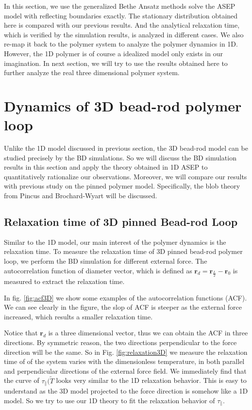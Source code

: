 In this section, we use the generalized Bethe Ansatz methods solve the ASEP model with reflecting boundaries exactly.  The stationary distribution obtained here is compared with our previous results. And the analytical relaxation time, which is verified by the simulation results, is analyzed in different cases. We also re-map it back to the polymer system to analyze the polymer dynamics in 1D. However, the 1D polymer is of course a idealized model only exists in our imagination. In next section, we will try to use the results obtained here to further analyze the real three dimensional polymer system.



\section{Dynamics of 3D bead-rod polymer loop}
\label{sec:dynamics_of_3d_bead_rod_polymer_loop}

Unlike the 1D model discussed in previous section, the 3D bead-rod model can be studied precisely by the BD simulations. So we will discuss the BD simulation results in this section and apply the theory obtained in 1D ASEP to quantitatively rationalize our observations. Moreover, we will compare our results with previous study on the pinned polymer model. Specifically, the blob theory from Pincus and Brochard-Wyart \cite{Brochard-Wyart1995} will be discussed.

\subsection{Relaxation time of 3D pinned Bead-rod Loop}
\label{sub:relaxation_time_of_3d_pinned_bead_rod_loop}

Similar to the 1D model, our main interest of the polymer dynamics is the relaxation time. To measure the relaxation time of 3D pinned bead-rod polymer loop, we perform the BD simulation for different external force. The autocorrelation function of diameter vector, which is defined as $\mathbf{r}_d = \mathbf{r}_{\frac{L}{2}} - \mathbf{r}_0$ is measured to extract the relaxation time. 

In fig. \ref{fig:acf3D} we show some examples of the autocorrelation functions (ACF). We can see clearly in the figure, the slop of ACF is steeper as the external force increased, which results a smaller relaxation time. 

Notice that $\mathbf{r}_d$ is a three dimensional vector, thus we can obtain the ACF in three directions. By symmetric reason, the two directions perpendicular to the force direction will be the same. So in Fig. \ref{fig:relaxation3D} we measure the relaxation time of of the system varies with the dimensionless temperature, in both parallel and perpendicular directions of the external force field. We immediately find that the curve of $\tau_{\parallel}(\tilde{T}$ looks very similar to the 1D relaxation behavior. This is easy to understand as the 3D model projected to the force direction is somehow like a 1D model. So we try to use our 1D theory to fit the relaxation behavior of $\tau_{\parallel}$.

